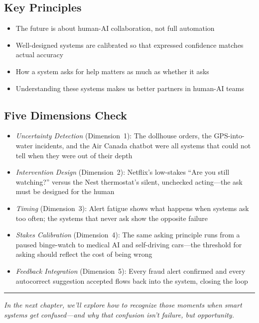 \subsection*{Key Principles}

\begin{itemize}
    \item The future is about human-AI collaboration, not full automation
    \item Well-designed systems are calibrated so that expressed confidence matches actual accuracy
    \item How a system asks for help matters as much as whether it asks
    \item Understanding these systems makes us better partners in human-AI teams
\end{itemize}

\subsection*{Five Dimensions Check}

\begin{itemize}
    \item \textit{Uncertainty Detection} (Dimension~1): The dollhouse orders, the GPS-into-water incidents, and the Air Canada chatbot were all systems that could not tell when they were out of their depth
    \item \textit{Intervention Design} (Dimension~2): Netflix's low-stakes ``Are you still watching?'' versus the Nest thermostat's silent, unchecked acting---the ask must be designed for the human
    \item \textit{Timing} (Dimension~3): Alert fatigue shows what happens when systems ask too often; the systems that never ask show the opposite failure
    \item \textit{Stakes Calibration} (Dimension~4): The same asking principle runs from a paused binge-watch to medical AI and self-driving cars---the threshold for asking should reflect the cost of being wrong
    \item \textit{Feedback Integration} (Dimension~5): Every fraud alert confirmed and every autocorrect suggestion accepted flows back into the system, closing the loop
\end{itemize}

\bigskip
\begin{center}
\rule{0.5\textwidth}{0.4pt}
\end{center}
\bigskip

\noindent\textit{In the next chapter, we'll explore how to recognize those moments when smart systems get confused---and why that confusion isn't failure, but opportunity.}

